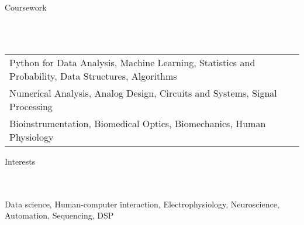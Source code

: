 \documentclass{article}
\newcommand{\lineunder} {
    \vspace*{-8pt} \\
    \hspace*{-18pt} \hrulefill \\
}
\newcommand{\header} [1] {
    {\hspace*{-18pt}\vspace*{6pt} \Large{#1} }
    \vspace*{-6pt} 
    \lineunder
}
\begin{document}
%
\vspace{5mm}
\header{Coursework}
\vspace{1mm}
\begin{tabular}{ l l }
	Python for Data Analysis, Machine Learning, Statistics and Probability, Data Structures, Algorithms \\
	Numerical Analysis, Analog Design, Circuits and Systems, Signal Processing \\
	Bioinstrumentation, Biomedical Optics, Biomechanics, Human Physiology
\end{tabular}
\vspace{5mm}

\header{Interests}
Data science, Human-computer interaction, Electrophysiology, Neuroscience, Automation, Sequencing, DSP
\end{document}
